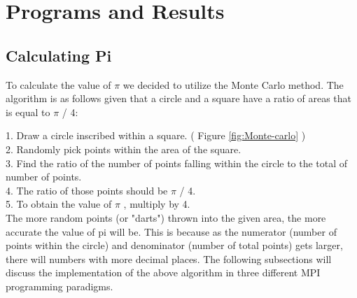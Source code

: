 
\chapter{Programs and Results} %

\label{Chapter 2} %


\section{Calculating Pi }
To calculate the value of $\pi$ we decided to utilize the Monte Carlo method. The algorithm is as follows given that a circle and a square have a ratio of areas that is equal to $\pi$ / 4: 

1. Draw a circle inscribed within a square. ( Figure \ref{fig:Monte-carlo} )\\
2. Randomly pick points within the area of the square.\\
3. Find the ratio of the number of points falling within the circle to the total of number of points.\\
4. The ratio of those points should be $\pi$ / 4.\\
5. To obtain the value of $\pi$ , multiply by 4.\\

The more random points (or "darts") thrown into the given area, the more accurate the value of pi will be. This is because as the numerator (number of points within the circle) and denominator (number of total points) gets larger, there will numbers with more decimal places. The following subsections will discuss the implementation of the above algorithm in three different MPI programming paradigms.

